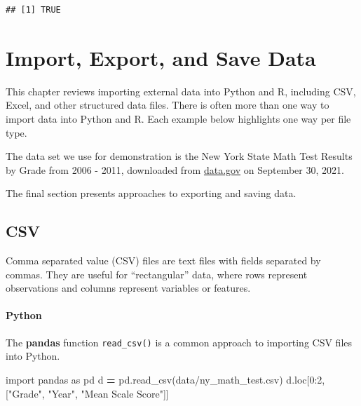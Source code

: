\documentclass[
]{book}
\newenvironment{Shaded}{\begin{snugshade}}{\end{snugshade}}
\newcommand{\DecValTok}[1]{\textcolor[rgb]{0.00,0.00,0.81}{#1}}
\newcommand{\ImportTok}[1]{#1}
\newcommand{\NormalTok}[1]{#1}
\newcommand{\OperatorTok}[1]{\textcolor[rgb]{0.81,0.36,0.00}{\textbf{#1}}}
\newcommand{\StringTok}[1]{\textcolor[rgb]{0.31,0.60,0.02}{#1}}
\begin{document}
\begin{verbatim}
## [1] TRUE
\end{verbatim}

\hypertarget{import-export-and-save-data}{%
\chapter{Import, Export, and Save Data}\label{import-export-and-save-data}}

This chapter reviews importing external data into Python and R, including CSV, Excel, and other structured data files. There is often more than one way to import data into Python and R. Each example below highlights one way per file type.

The data set we use for demonstration is the New York State Math Test Results by Grade from 2006 - 2011, downloaded from \href{https://catalog.data.gov/dataset/2006-2011-nys-math-test-results-by-grade-citywide-by-race-ethnicity}{data.gov} on September 30, 2021.

The final section presents approaches to exporting and saving data.

\hypertarget{csv}{%
\section{CSV}\label{csv}}

Comma separated value (CSV) files are text files with fields separated by commas. They are useful for ``rectangular'' data, where rows represent observations and columns represent variables or features.

\hypertarget{python-12}{%
\subsubsection*{Python}\label{python-12}}

The \textbf{pandas} function \texttt{read\_csv()} is a common approach to importing CSV files into Python.

\begin{Shaded}
\begin{Highlighting}[]
\ImportTok{import}\NormalTok{ pandas }\ImportTok{as}\NormalTok{ pd}
\NormalTok{d }\OperatorTok{=}\NormalTok{ pd.read\_csv(}\StringTok{\textquotesingle{}data/ny\_math\_test.csv\textquotesingle{}}\NormalTok{)}
\NormalTok{d.loc[}\DecValTok{0}\NormalTok{:}\DecValTok{2}\NormalTok{, [}\StringTok{"Grade"}\NormalTok{, }\StringTok{"Year"}\NormalTok{, }\StringTok{"Mean Scale Score"}\NormalTok{]]}
\end{Highlighting}
\end{Shaded}
\end{document}
